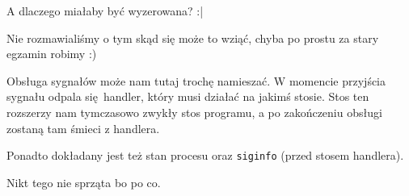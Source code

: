 A dlaczego miałaby być wyzerowana? :|

Nie rozmawialiśmy o tym skąd się może to wziąć, chyba po prostu za stary egzamin robimy :)

Obsługa sygnałów może nam tutaj trochę namieszać.
W momencie przyjścia sygnału odpala się handler, który musi działać na jakimś stosie. Stos ten rozszerzy nam tymczasowo 
zwykły stos programu, a po zakończeniu obsługi zostaną tam śmieci z handlera.

Ponadto dokładany jest też stan procesu oraz \texttt{siginfo} (przed stosem handlera).

Nikt tego nie sprząta bo po co.